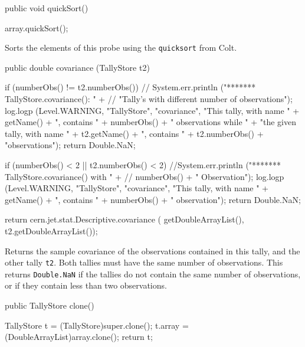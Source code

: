 \begin{code}

   public void quickSort() \begin{hide} {
       array.quickSort();
   }\end{hide}
\end{code}
\begin{tabb} Sorts the elements of this probe using the \texttt{quicksort}
  from Colt.
\end{tabb}
\begin{code}

   public double covariance (TallyStore t2)\begin{hide} {
      if (numberObs() != t2.numberObs()) {
         // System.err.println ("******* TallyStore.covariance(): " +
         // "Tally's with different number of observations");
         log.logp (Level.WARNING, "TallyStore", "covariance",
            "This tally, with name " + getName() + ", contains " + numberObs() +
            " observations while " + "the given tally, with name " +
            t2.getName() + ", contains " + t2.numberObs() + "observations");
         return Double.NaN;
      }

      if (numberObs() < 2 || t2.numberObs() < 2) {
         //System.err.println ("******* TallyStore.covariance()   with " +
         // numberObs() + " Observation");
         log.logp (Level.WARNING, "TallyStore", "covariance",
            "This tally, with name " + getName() + ", contains " + numberObs() + " observation");
         return Double.NaN;
      }

      return cern.jet.stat.Descriptive.covariance (
          getDoubleArrayList(), t2.getDoubleArrayList());
   }\end{hide}
\end{code}
\begin{tabb}   Returns the sample covariance of the observations contained
 in this tally, and the other tally \texttt{t2}.
 Both tallies must have the same number of observations.
   This returns \texttt{Double.NaN}
   if the tallies do not contain the same number of observations, or
 if they contain less than two observations.
\end{tabb}
\begin{htmlonly}
\end{htmlonly}
\begin{code}

   public TallyStore clone()\begin{hide} {
      TallyStore t = (TallyStore)super.clone();
      t.array = (DoubleArrayList)array.clone();
      return t;
   }\end{hide}
\end{code}
